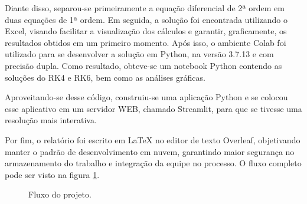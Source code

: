 \documentclass[a4paper,11pt]{article}
\begin{document}
    
    Diante disso, separou-se primeiramente a equação diferencial de 2ª ordem em duas equações de 1ª ordem. Em seguida, a solução foi encontrada utilizando o Excel, visando facilitar a visualização dos cálculos e garantir, graficamente, os resultados obtidos em um primeiro momento. Após isso, o ambiente Colab foi utilizado para se desenvolver a solução em Python, na versão 3.7.13 e com precisão dupla. Como resultado, obteve-se um notebook Python contendo as soluções do RK4 e RK6, bem como as análises gráficas.
    
    
    Aproveitando-se desse código, construiu-se uma aplicação Python e se colocou esse aplicativo em um servidor WEB, chamado Streamlit, para que se tivesse uma resolução mais interativa.
    
    
    Por fim, o relatório foi escrito em LaTeX no editor de texto Overleaf, objetivando manter o padrão de desenvolvimento em nuvem, garantindo maior segurança no armazenamento do trabalho e integração da equipe no processo. O fluxo completo pode ser visto na figura \ref{fluxo}.
    
    \begin{figure}[H]
        \centering
        \caption[width=\columnwidth]{Fluxo do projeto.}
        \label{fluxo}
    \end{figure}
    
\end{document}
